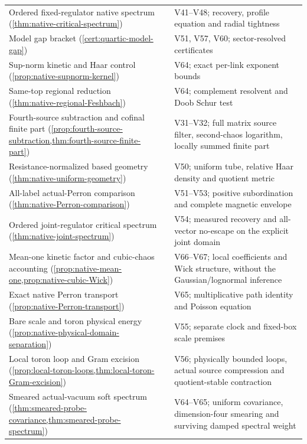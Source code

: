 \documentclass[11pt,oneside,openany]{book}
\theoremstyle{definition}
\theoremstyle{remark}
\begin{document}
\begin{longtable}{L{0.32\textwidth}L{0.12\textwidth}L{0.477\textwidth}}
Ordered fixed-regulator native spectrum (\cref{thm:native-critical-spectrum}) & \cite{F16} & V41--V48; recovery, profile equation and radial tightness \\
Model gap bracket (\cref{cert:quartic-model-gap}) & \cite{F16} & V51, V57, V60; sector-resolved certificates \\
Sup-norm kinetic and Haar control (\cref{prop:native-supnorm-kernel}) & \cite{F16} & V64; exact per-link exponent bounds \\
Same-top regional reduction (\cref{thm:native-regional-Feshbach}) & \cite{F16} & V64; complement resolvent and Doob Schur test \\
Fourth-source subtraction and cofinal finite part (\cref{prop:fourth-source-subtraction,thm:fourth-source-finite-part}) & \cite{F14} & V31--V32; full matrix source filter, second-chaos logarithm, locally summed finite part \\
Resistance-normalized based geometry (\cref{thm:native-uniform-geometry}) & \cite{F16B} & V50; uniform tube, relative Haar density and quotient metric \\
All-label actual-Perron comparison (\cref{thm:native-Perron-comparison}) & \cite{F16B} & V51--V53; positive subordination and complete magnetic envelope \\
Ordered joint-regulator critical spectrum (\cref{thm:native-joint-spectrum}) & \cite{F16B} & V54; measured recovery and all-vector no-escape on the explicit joint domain \\
Mean-one kinetic factor and cubic-chaos accounting (\cref{prop:native-mean-one,prop:native-cubic-Wick}) & \cite{F16} & V66--V67; local coefficients and Wick structure, without the Gaussian/lognormal inference \\
Exact native Perron transport (\cref{prop:native-Perron-transport}) & \cite{F16} & V65; multiplicative path identity and Poisson equation \\
Bare scale and toron physical energy (\cref{prop:native-physical-domain-separation}) & \cite{F16B} & V55; separate clock and fixed-box scale premises \\
Local toron loop and Gram excision (\cref{prop:local-toron-loops,thm:local-toron-Gram-excision}) & \cite{F16B} & V56; physically bounded loops, actual source compression and quotient-stable contraction \\
Smeared actual-vacuum soft spectrum (\cref{thm:smeared-probe-covariance,thm:smeared-probe-spectrum}) & \cite{F15} & V64--V65; uniform covariance, dimension-four smearing and surviving damped spectral weight \\

\end{longtable}
\end{document}
